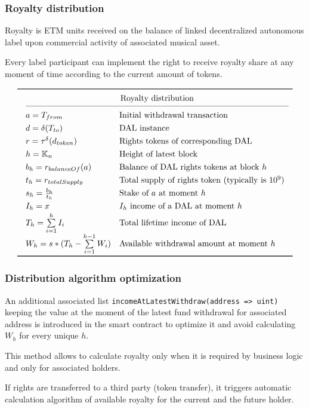 \documentclass[12pt]{report}
\def\code#1{\colorbox{light-gray}{\texttt{#1}}}
\begin{document}
\subsubsection{Royalty distribution}
\label{tech-apps-dal-royalty}
\begin{multicols}{2}
Royalty is ETM units received on the balance of linked decentralized autonomous label upon commercial activity of associated musical asset.

Every label participant can implement the right to receive royalty share at any moment of time according to the current amount of tokens.
\end{multicols}
\begin{equation}
\def\arraystretch{1.3}
\begin{array}{@{}llll@{}}
\toprule
    & \multicolumn{2}{c@{}}{\text{Royalty distribution}} & \\
\cmidrule(l){2-3}
    & a = T_{from} & \text{Initial withdrawal transaction} & \\
    & d = \delta(T_{to}) & \text{DAL instance} & \\
    & r = \tau^\delta(d_{token}) & \text{Rights tokens of corresponding DAL} & \\
    & h = \mathbb{K}_n & \text{Height of latest block} & \\
    & b_h = r_{balanceOf}(a) & \text{Balance of DAL rights tokens at block } h & \\
    & t_h = r_{totalSupply} & \text{Total supply of rights token (typically is } 10^9 \text{)} & \\
    & s_h = \frac{b_h}{t_h} & \text{Stake of } a \text{ at moment } h & \\
    & I_h = x & I_h \text{ income of a DAL at moment } h & \\
    & T_h = \sum\limits^{h}_{i=1} I_i & \text{Total lifetime income of DAL} & \\
    & W_h = s * (T_h - \sum\limits^{h-1}_{i=1} W_i) & \text{Available withdrawal amount at moment } h & \\
\bottomrule
\end{array}
\end{equation}
\subsubsection{Distribution algorithm optimization}
\label{tech-apps-dal-royalty-optimization}
\begin{multicols}{2}
An additional associated list  \code{incomeAtLatestWithdraw(address => uint)} keeping the value at the moment of the latest fund withdrawal for associated address is introduced in the smart contract  to optimize it and avoid calculating $W_h$ for every unique $h$.

This method allows to calculate royalty only when it is required by business logic and only for associated holders.

If rights are transferred to a third party (token transfer), it triggers automatic calculation algorithm of available royalty for the current and the future holder.
\end{multicols}
\end{document}
